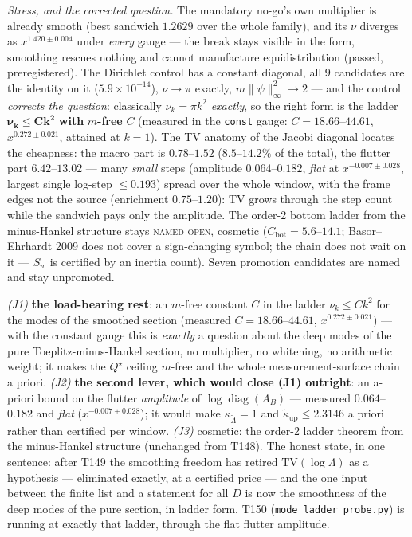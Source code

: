 \documentclass[11pt,a4paper]{article}
\begin{document}
\emph{Stress, and the corrected question.} The mandatory no-go's own multiplier is already
smooth (best sandwich $1.2629$ over the whole family), and its $\nu$ diverges as
$x^{1.420\pm0.004}$ under \emph{every} gauge --- the break stays visible in the form,
smoothing rescues nothing and cannot manufacture equidistribution (passed, preregistered).
The Dirichlet control has a constant diagonal, all $9$ candidates are the identity on it
($5.9\times10^{-14}$), $\nu\to\pi$ exactly, $m\|\psi\|_\infty^2\to2$ --- and the control
\emph{corrects the question}: classically $\nu_k=\pi k^2$ \emph{exactly}, so the right form is
the ladder $\mathbf{\nu_k\le Ck^2}$ \textbf{with} $m$\textbf{-free} $C$ (measured in the
\texttt{const} gauge: $C=18.66$--$44.61$, $x^{0.272\pm0.021}$, attained at $k=1$). The TV
anatomy of the Jacobi diagonal locates the cheapness: the macro part is $0.78$--$1.52$
($8.5$--$14.2\%$ of the total), the flutter part $6.42$--$13.02$ --- many \emph{small} steps
(amplitude $0.064$--$0.182$, \emph{flat} at $x^{-0.007\pm0.028}$, largest single log-step
$\le0.193$) spread over the whole window, with the frame edges not the source (enrichment
$0.75$--$1.20$): TV grows through the step count while the sandwich pays only the amplitude.
The order-2 bottom ladder from the minus-Hankel structure stays \textsc{named open}, cosmetic
($C_{\mathrm{bot}}=5.6$--$14.1$; Basor--Ehrhardt 2009 does not cover a sign-changing symbol;
the chain does not wait on it --- $S_w$ is certified by an inertia count). Seven promotion
candidates are named and stay unpromoted.

\begin{keybox}
\emph{(J1)} \textbf{the load-bearing rest}: an $m$-free constant $C$ in the ladder
$\nu_k\le Ck^2$ for the modes of the smoothed section (measured $C=18.66$--$44.61$,
$x^{0.272\pm0.021}$) --- with the constant gauge this is \emph{exactly} a question about the
deep modes of the pure Toeplitz-minus-Hankel section, no multiplier, no whitening, no
arithmetic weight; it makes the $Q^\star$ ceiling $m$-free and the whole measurement-surface
chain a priori. \emph{(J2)} \textbf{the second lever, which would close (J1) outright}: an
a-priori bound on the flutter \emph{amplitude} of $\log\operatorname{diag}(A_B)$ --- measured
$0.064$--$0.182$ and \emph{flat} ($x^{-0.007\pm0.028}$); it would make
$\kappa_{\tilde\Lambda}=1$ and $\tilde\kappa_{\mathrm{up}}\le2.3146$ a priori rather than
certified per window. \emph{(J3)} cosmetic: the order-2 ladder theorem from the minus-Hankel
structure (unchanged from T148). The honest state, in one sentence: after T149 the smoothing
freedom has retired $\mathrm{TV}(\log\Lambda)$ as a hypothesis --- eliminated exactly, at a
certified price --- and the one input between the finite list and a statement for all $D$ is
now the smoothness of the deep modes of the pure section, in ladder form.
T150 (\texttt{mode\_ladder\_probe.py}) is running at exactly that ladder, through the flat
flutter amplitude.
\end{keybox}
\end{document}
